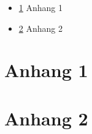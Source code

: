 
\begin{itemize}
	\item \ref{apx:1} Anhang 1
	\item \ref{apx:2} Anhang 2
\end{itemize}

\chapter{Anhang 1}
\label{apx:1}

\chapter{Anhang 2}
\label{apx:2}
